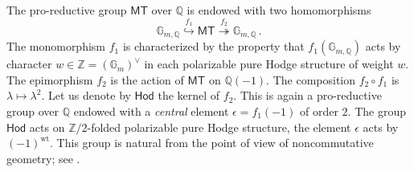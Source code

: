 \documentclass[12pt,a4paper]{amsart}
\theoremstyle{definition}
\theoremstyle{remark}
\newcommand{\Q}{\mathbb{Q}}
\newcommand{\Z}{\mathbb{Z}}
\newcommand{\C}{\mathbb{C}}
\begin{document}
The pro-reductive group $\mathsf{MT}$ over $\Q$ is endowed with two homomorphisms
$$\mathbb G_{m,\Q}\stackrel{f_1}{\hookrightarrow}\mathsf{MT}\stackrel{f_2}{\twoheadrightarrow} \mathbb G_{m,\Q}\,.$$
The monomorphism $f_1$ is characterized by the property that $f_1(\mathbb G_{m,\Q})$
acts by character $w\in \Z=(\mathbb G_m)^\vee$ in each polarizable pure Hodge structure of weight $w$. The epimorphism $f_2$ is the action of $\mathsf{MT}$ on $\Q(-1)$. The composition $f_2\circ f_1$ is $\lambda\mapsto \lambda^2$.
Let us denote by $\mathsf{Hod}$ the kernel of
$f_2$. This is again a pro-reductive group over $\Q$ endowed with a \emph{central} element $\epsilon=f_1(-1)$ of order $2$. The group $\mathsf{Hod}$ acts on $\Z/2$-folded polarizable pure Hodge structure, the element $\epsilon$ acts by $(-1)^{\mathrm{wt}}$. This group is natural from the point of view of noncommutative geometry; see \cite{KatzarkovKontsevichPantev2008}.
\end{document}
